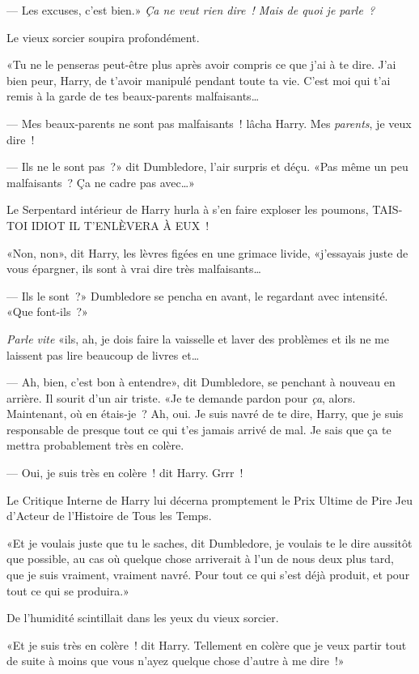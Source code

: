 --- Les excuses, c'est bien.» \emph{Ça ne veut rien dire~! Mais de quoi je parle~?}

Le vieux sorcier soupira profondément.

«Tu ne le penseras peut-être plus après avoir compris ce que j'ai à te dire. J'ai bien peur, Harry, de t'avoir manipulé pendant toute ta vie. C'est moi qui t'ai remis à la garde de tes beaux-parents malfaisants…

--- Mes beaux-parents ne sont pas malfaisants~! lâcha Harry. Mes \emph{parents}, je veux dire~!

--- Ils ne le sont pas~?» dit Dumbledore, l'air surpris et déçu. «Pas même un peu malfaisants~? Ça ne cadre pas avec…»

Le Serpentard intérieur de Harry hurla à s'en faire exploser les poumons, TAIS-TOI IDIOT IL T'ENLÈVERA À EUX~!

«Non, non», dit Harry, les lèvres figées en une grimace livide, «j'essayais juste de vous épargner, ils sont à vrai dire très malfaisants…

--- Ils le sont~?» Dumbledore se pencha en avant, le regardant avec intensité. «Que font-ils~?»

\emph{Parle vite} «ils, ah, je dois faire la vaisselle et laver des problèmes et ils ne me laissent pas lire beaucoup de livres et…

--- Ah, bien, c'est bon à entendre», dit Dumbledore, se penchant à nouveau en arrière. Il sourit d'un air triste. «Je te demande pardon pour \emph{ça}, alors. Maintenant, où en étais-je~? Ah, oui. Je suis navré de te dire, Harry, que je suis responsable de presque tout ce qui t'es jamais arrivé de mal. Je sais que ça te mettra probablement très en colère.

--- Oui, je suis très en colère~! dit Harry. Grrr~!

Le Critique Interne de Harry lui décerna promptement le Prix Ultime de Pire Jeu d'Acteur de l'Histoire de Tous les Temps.

«Et je voulais juste que tu le saches, dit Dumbledore, je voulais te le dire aussitôt que possible, au cas où quelque chose arriverait à l'un de nous deux plus tard, que je suis vraiment, vraiment navré. Pour tout ce qui s'est déjà produit, et pour tout ce qui se produira.»

De l'humidité scintillait dans les yeux du vieux sorcier.

«Et je suis très en colère~! dit Harry. Tellement en colère que je veux partir tout de suite à moins que vous n'ayez quelque chose d'autre à me dire~!»

